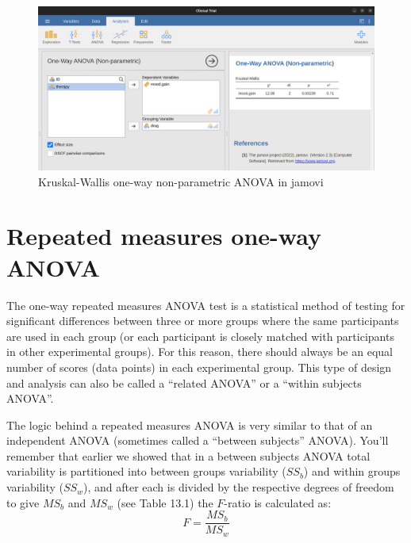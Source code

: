 \documentclass[
  a4paper,
]{book}
\begin{document}
\begin{figure}

\includegraphics[width=1\textwidth,height=\textheight]{images/fig13-8.png} \hfill{}

\caption{\label{fig-fig13-8}Kruskal-Wallis one-way non-parametric ANOVA
in jamovi}

\end{figure}

\hypertarget{repeated-measures-one-way-anova}{%
\section{Repeated measures one-way
ANOVA}\label{repeated-measures-one-way-anova}}

The one-way repeated measures ANOVA test is a statistical method of
testing for significant differences between three or more groups where
the same participants are used in each group (or each participant is
closely matched with participants in other experimental groups). For
this reason, there should always be an equal number of scores (data
points) in each experimental group. This type of design and analysis can
also be called a ``related ANOVA'' or a ``within subjects ANOVA''.

The logic behind a repeated measures ANOVA is very similar to that of an
independent ANOVA (sometimes called a ``between subjects'' ANOVA).
You'll remember that earlier we showed that in a between subjects ANOVA
total variability is partitioned into between groups variability
(\(SS_b\)) and within groups variability (\(SS_w\)), and after each is
divided by the respective degrees of freedom to give \(MS_b\) and
\(MS_w\) (see Table 13.1) the \(F\)-ratio is calculated as:
\[F=\frac{MS_b}{MS_w}\]
\end{document}
